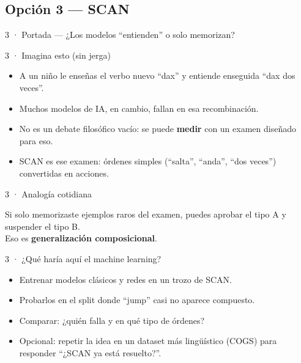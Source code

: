 \subsection{Opción 3 --- SCAN}

\begin{frame}{3 · Portada --- ¿Los modelos ``entienden'' o solo memorizan?}
\end{frame}

\begin{frame}{3 · Imagina esto (sin jerga)}
  \begin{itemize}
    \item A un niño le enseñas el verbo nuevo ``dax'' y entiende enseguida ``dax dos veces''.
    \item Muchos modelos de IA, en cambio, fallan en esa recombinación.
    \item No es un debate filosófico vacío: se puede \textbf{medir} con un examen diseñado para eso.
    \item SCAN es ese examen: órdenes simples (``salta'', ``anda'', ``dos veces'') convertidas en acciones.
  \end{itemize}
\end{frame}

\begin{frame}{3 · Analogía cotidiana}
  \begin{center}
  \end{center}
  \vspace{0.45em}
  Si solo memorizaste ejemplos raros del examen, puedes aprobar el tipo A y suspender el tipo B.\\
  Eso es \textbf{generalización composicional}.
\end{frame}

\begin{frame}{3 · ¿Qué haría aquí el machine learning?}
  \begin{itemize}
    \item Entrenar modelos clásicos y redes en un trozo de SCAN.
    \item Probarlos en el split donde ``jump'' casi no aparece compuesto.
    \item Comparar: ¿quién falla y en qué tipo de órdenes?
    \item Opcional: repetir la idea en un dataset más lingüístico (COGS) para responder ``¿SCAN ya está resuelto?''.
  \end{itemize}
\end{frame}

